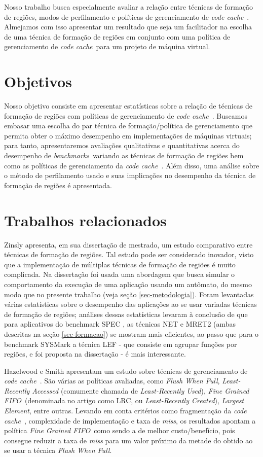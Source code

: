 \documentclass[11pt,twoside]{article}
\newcommand{\ccache}{\emph{code cache}}
\newcommand{\benchmarks}{\emph{benchmarks}}
\newcommand{\flush}{\emph{Flush When Full}}
\newcommand{\finefifo}{\emph{Fine Grained FIFO}}
\begin{document}
Nosso trabalho busca especialmente avaliar a relação entre técnicas de formação de regiões, modos de perfilamento e políticas de gerenciamento de \ccache~. Almejamos com isso apresentar um resultado que seja um facilitador na escolha de uma técnica de formação de regiões em conjunto com uma política de gerenciamento de \ccache~para um projeto de máquina virtual. 


\section{Objetivos}
Nosso objetivo consiste em apresentar estatísticas sobre a relação de técnicas de formação de regiões com políticas de gerenciamento de \ccache~. Buscamos embasar uma escolha do par técnica de formação/política de gerenciamento que permita obter o máximo desempenho em implementações de máquinas virtuais; para tanto, apresentaremos avaliações qualitativas e quantitativas acerca do desempenho de \benchmarks~variando as técnicas de formação de regiões bem como as políticas de gerenciamento da \ccache~. Além disso, uma análise sobre o método de perfilamento usado e suas implicações no desempenho da técnica de formação de regiões é apresentada.


\section{Trabalhos relacionados}
Zinsly \cite{thesis-zinsly} apresenta, em sua dissertação de mestrado, um estudo comparativo entre técnicas de formação de regiões. Tal estudo pode ser considerado inovador, visto que a implementação de múltiplas técnicas de formação de regiões é muito complicada. Na dissertação foi usada uma abordagem que busca simular o comportamento da execução de uma aplicação usando um autômato, do mesmo modo que no presente trabalho (veja seção \ref{sec-metodologia}). Foram levantadas várias estatísticas sobre o desempenho das aplicações ao se usar variadas técnicas de formação de regiões; análises dessas estatísticas levaram à conclusão de que para aplicativos do benchmark SPEC \cite{spec-url}, as técnicas NET e MRET2 (ambas descritas na seção \ref{sec-formacao}) se mostram mais eficientes, ao passo que para o benchmark SYSMark \cite{sysmark-url} a técnica LEF - que consiste em agrupar funções por regiões, e foi proposta na dissertação - é mais interessante. 

Hazelwood e Smith \cite{hazelwood-2002} apresentam um estudo sobre técnicas de gerenciamento de \ccache~. São várias as políticas avaliadas, como \flush, \emph{Least-Recently Accessed} (comumente chamada de \emph{Least-Recently Used}), \finefifo~(denominada no artigo como LRC, ou \emph{Least-Recently Created}),\emph{ Largest Element}, entre outras. Levando em conta critérios como fragmentação da \ccache~, complexidade de implementação e taxa de \emph{miss}, os resultados apontam a política \finefifo~como sendo a de melhor custo/benefício, pois consegue reduzir a taxa de \emph{miss} para um valor próximo da metade do obtido ao se usar a técnica \flush.
\end{document}
